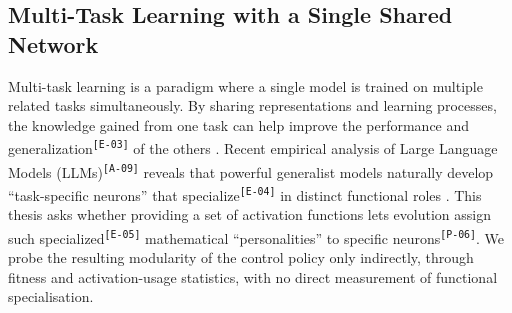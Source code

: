 \documentclass[12pt]{article}
\newcommand{\revID}[1]{\textsuperscript{\scriptsize\texttt{[#1]}}}
\newcommand{\revPlain}[2]{\textcolor{lrGreen}{#2}\revID{#1}}    %
\newcommand{\revBrit}[2]{\textcolor{lrBlue}{#2}\revID{#1}}      %
\newcommand{\revAcro}[2]{\textcolor{lrPurple}{#2}\revID{#1}}    %
\begin{document}
\subsection{Multi-Task Learning with a Single Shared Network}
\label{subsec:multi-task-learning-with-a-single}


Multi-task learning is a paradigm where a single model is trained on multiple related tasks simultaneously.
By sharing representations and learning processes, the knowledge gained from one task can help improve the performance and \revBrit{E-03}{generalization} of the others \parencite{zhang_survey_2021}.
Recent empirical analysis of \revAcro{A-09}{Large Language Models (LLMs)} reveals that powerful generalist models naturally develop ``task-specific neurons'' that \revBrit{E-04}{specialize} in distinct functional roles \parencite{leng_understanding_2025}.
This thesis asks whether providing a set of activation functions lets evolution assign such \revBrit{E-05}{specialized} \revPlain{P-06}{mathematical ``personalities'' to specific neurons}. We probe the resulting modularity of the control policy only indirectly, through fitness and activation-usage statistics, with no direct measurement of functional specialisation.
\end{document}
